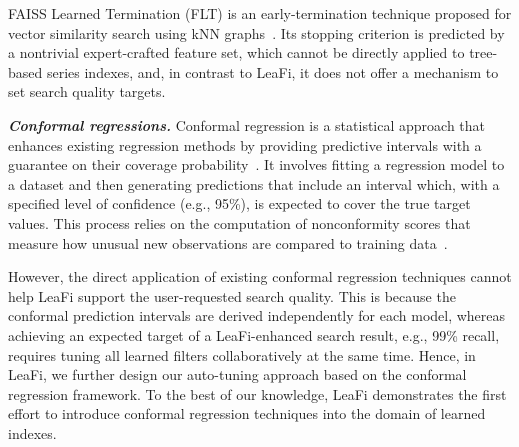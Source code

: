 FAISS Learned Termination (FLT) is an early-termination technique proposed for vector similarity search using kNN graphs~\cite{DBLP:conf/sigmod/LiZAH20}.
Its stopping criterion is predicted by a nontrivial expert-crafted feature set, which cannot be directly applied to tree-based series indexes, and, in contrast to LeaFi, it does not offer a mechanism to set search quality targets.



\noindent \textbf{\textit{Conformal regressions.}}
\label{sec-lit-conformal}
Conformal regression is a statistical approach that enhances existing regression methods by providing predictive intervals with a guarantee on their coverage probability~\cite{GS:vovk2005algorithmic}. 
It involves fitting a regression model to a dataset and then generating predictions that include an interval which, with a specified level of confidence (e.g., 95\%), is expected to cover the true target values. 
This process relies on the computation of nonconformity scores that measure how unusual new observations are compared to training data~\cite{DBLP:conf/ecml/PapadopoulosPVG02, DBLP:journals/ftml/AngelopoulosB23}.

However, the direct application of existing conformal regression techniques cannot help LeaFi support the user-requested search quality.
This is because the conformal prediction intervals are derived independently for each model, whereas achieving an expected target of a LeaFi-enhanced search result, e.g., 99\% recall, requires tuning all learned filters collaboratively at the same time.
Hence, in LeaFi, we further design our auto-tuning approach based on the conformal regression framework.
To the best of our knowledge, LeaFi demonstrates the first effort to introduce conformal regression techniques into the domain of learned indexes.